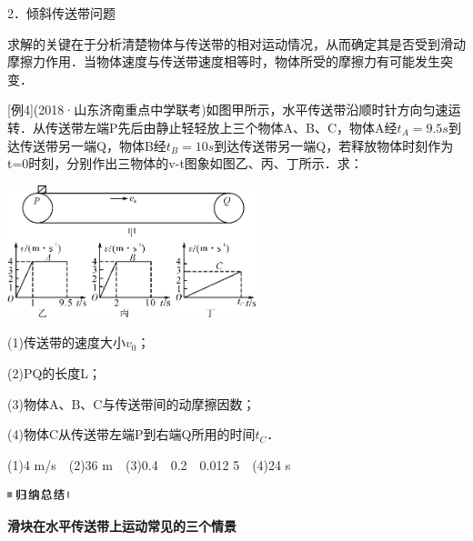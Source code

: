 2．倾斜传送带问题

求解的关键在于分析清楚物体与传送带的相对运动情况，从而确定其是否受到滑动摩擦力作用．当物体速度与传送带速度相等时，物体所受的摩擦力有可能发生突变．

{[}例4{]}(2018·山东济南重点中学联考)如图甲所示，水平传送带沿顺时针方向匀速运转．从传送带左端P先后由静止轻轻放上三个物体A、B、C，物体A经$t_A=9.5s$到达传送带另一端Q，物体B经$t_B=10s$到达传送带另一端Q，若释放物体时刻作为t=0时刻，分别作出三物体的v-t图象如图乙、丙、丁所示．求：

\begin{center}\includegraphics[width=2.84375in,height=1.51042in]{media/image122.png}\end{center}

(1)传送带的速度大小$v_0$；

(2)PQ的长度L；

(3)物体A、B、C与传送带间的动摩擦因数；

(4)物体C从传送带左端P到右端Q所用的时间$t_C$．
\begin{solution}
	(1)4 m/s　(2)36 m　(3)0.4　0.2　0.012 5　(4)24 s
\end{solution}

\begin{center}\includegraphics[width=0.70833in,height=0.125in]{media/image13.png}

\textbf{滑块在水平传送带上运动常见的三个情景}
\end{center}


